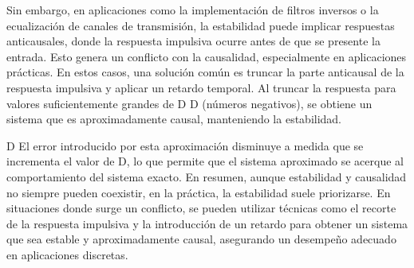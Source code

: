 \documentclass[10pt]{article}
\theoremstyle{definition}
\theoremstyle{remark}
\theoremstyle{definition}
\numberwithin{equation}{prob}
\begin{document}
Sin embargo, en aplicaciones como la implementación de filtros inversos o la ecualización de canales de transmisión, la estabilidad puede implicar respuestas anticausales, donde la respuesta impulsiva ocurre antes de que se presente la entrada. Esto genera un conflicto con la causalidad, especialmente en aplicaciones prácticas. En estos casos, una solución común es truncar la parte anticausal de la respuesta impulsiva y aplicar un retardo temporal. Al truncar la respuesta para valores suficientemente grandes de D
D (números negativos), se obtiene un sistema que es aproximadamente causal, manteniendo la estabilidad. 

D El error introducido por esta aproximación disminuye a medida que se incrementa el valor de D, lo que permite que el sistema aproximado se acerque al comportamiento del sistema exacto. En resumen, aunque estabilidad y causalidad no siempre pueden coexistir, en la práctica, la estabilidad suele priorizarse. En situaciones donde surge un conflicto, se pueden utilizar técnicas como el recorte de la respuesta impulsiva y la introducción de un retardo para obtener un sistema que sea estable y aproximadamente causal, asegurando un desempeño adecuado en aplicaciones discretas.
\end{document}
